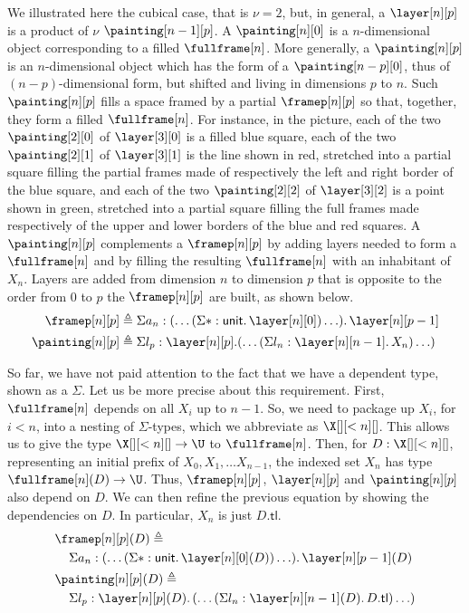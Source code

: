 \documentclass{msc}
\newcommand{\unittype}{\ensuremath{\mathsf{unit}}}
\newcommand{\unitpoint}{\ensuremath{\ast}}
\newcommand{\defeq}{\ensuremath{\triangleq}}
\newcommand{\tl}{\ensuremath{\mathsf{tl}}}
\begin{document}
We illustrated here the cubical case, that is $\nu = 2$, but, in general, a $\layer[n][p]$ is a product of $\nu$ $\painting[n - 1][p]$. A $\painting[n][0]$ is a $n$-dimensional object corresponding to a filled $\fullframe[n]$. More generally, a $\painting[n][p]$ is an $n$-dimensional object which has the form of a $\painting[n-p][0]$, thus of $(n-p)$-dimensional form, but shifted and living in dimensions $p$ to $n$. Such $\painting[n][p]$ fills a space framed by a partial $\framep[n][p]$ so that, together, they form a filled $\fullframe[n]$. For instance, in the picture, each of the two $\painting[2][0]$ of $\layer[3][0]$ is a filled blue square, each of the two $\painting[2][1]$ of $\layer[3][1]$ is the line shown in red, stretched into a partial square filling the partial frames made of respectively the left and right border of the blue square, and each of the two $\painting[2][2]$ of $\layer[3][2]$ is a point shown in green, stretched into a partial square filling the full frames made respectively of the upper and lower borders of the blue and red squares. A $\painting[n][p]$ complements a $\framep[n][p]$ by adding layers needed to form a $\fullframe[n]$ and by filling the resulting $\fullframe[n]$ with an inhabitant of $X_n$. Layers are added from dimension $n$ to dimension $p$ that is opposite to the order from $0$ to $p$ the $\framep[n][p]$ are built, as shown below.
\begin{align*}
  \framep[n][p]   & \defeq \Sigma a_n: (\ldots (\Sigma \unitpoint: \unittype .\, \layer[n][0]) \ldots) .\, \layer[n][p - 1] \\
  \painting[n][p] & \defeq \Sigma l_p: \layer[n][p]. (\ldots (\Sigma l_n: \layer[n][n - 1] .\, X_n) \ldots)
\end{align*}

So far, we have not paid attention to the fact that we have a dependent type, shown as a $\Sigma$. Let us be more precise about this requirement. First, $\fullframe[n]$ depends on all $X_i$ up to $n - 1$. So, we need to package up $X_i$, for $i < n$, into a nesting of $\Sigma$-types, which we abbreviate as $\X[][<n][]$. This allows us to give the type $\X[][<n][] \rightarrow \U$ to $\fullframe[n]$. Then, for $D: \X[][<n][]$, representing an initial prefix of $X_0, X_1, \ldots X_{n - 1}$, the indexed set $X_n$ has type $\fullframe[n](D) \rightarrow \U$. Thus, $\framep[n][p]$, $\layer[n][p]$ and $\painting[n][p]$ also depend on $D$. We can then refine the previous equation by showing the dependencies on $D$. In particular, $X_n$ is just $D.\tl$.
\begin{align*}
   & \framep[n][p](D) \defeq                                                                                      \\
   & \;\;\;\;\Sigma a_n: (\ldots (\Sigma \unitpoint: \unittype.\, \layer[n][0](D)) \ldots) .\,\layer[n][p - 1](D) \\
   & \painting[n][p](D) \defeq                                                                                    \\
   & \;\;\;\;\Sigma l_p: \layer[n][p](D).\, (\ldots (\Sigma l_n: \layer[n][n - 1](D) .\, D.\tl) \ldots)
\end{align*}
\end{document}
